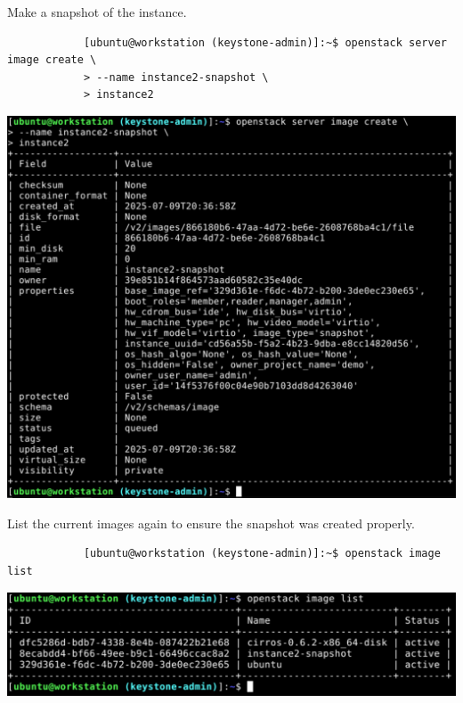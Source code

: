 \documentclass[letterpaper, 12pt]{article}
\begin{document}
\begin{enumerate}
    \begin{labstep}
        Make a snapshot of the instance.
        \begin{lstlisting}
            [ubuntu@workstation (keystone-admin)]:~$ openstack server image create \
            > --name instance2-snapshot \
            > instance2
        \end{lstlisting}

        \begin{center}
            \includegraphics[width=\linewidth]{images/part2/step10.png}
        \end{center}
    \end{labstep}

    \begin{labstep}
        List the current images again to ensure the snapshot was created properly.
        \begin{lstlisting}
            [ubuntu@workstation (keystone-admin)]:~$ openstack image list
        \end{lstlisting}

        \begin{center}
            \includegraphics[width=\linewidth]{images/part2/step11.png}
        \end{center}
    \end{labstep}


\end{enumerate}
\end{document}
